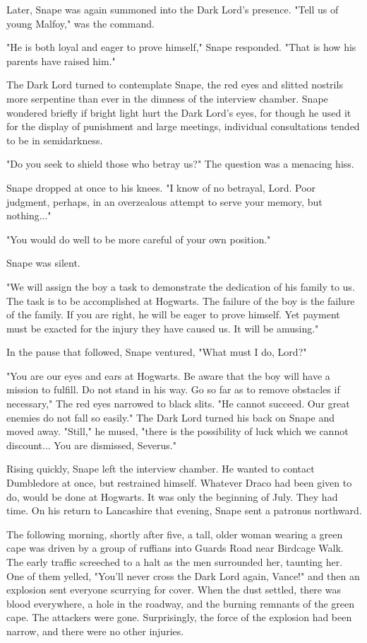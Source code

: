 \documentclass[a4paper,11pt]{article}
\begin{document}
Later, Snape was again summoned into the Dark Lord's presence. "Tell us of young Malfoy," was the command.

"He is both loyal and eager to prove himself," Snape responded. "That is how his parents have raised him."

The Dark Lord turned to contemplate Snape, the red eyes and slitted nostrils more serpentine than ever in the dimness of the interview chamber. Snape wondered briefly if bright light hurt the Dark Lord's eyes, for though he used it for the display of punishment and large meetings, individual consultations tended to be in semidarkness.

"Do you seek to shield those who betray us?" The question was a menacing hiss.

Snape dropped at once to his knees. "I know of no betrayal, Lord. Poor judgment, perhaps, in an overzealous attempt to serve your memory, but nothing..."

"You would do well to be more careful of your own position."

Snape was silent.

"We will assign the boy a task to demonstrate the dedication of his family to us. The task is to be accomplished at Hogwarts. The failure of the boy is the failure of the family. If you are right, he will be eager to prove himself. Yet payment must be exacted for the injury they have caused us. It will be amusing."

In the pause that followed, Snape ventured, "What must I do, Lord?"

"You are our eyes and ears at Hogwarts. Be aware that the boy will have a mission to fulfill. Do not stand in his way. Go so far as to remove obstacles if necessary," The red eyes narrowed to black slits. "He cannot succeed. Our great enemies do not fall so easily." The Dark Lord turned his back on Snape and moved away. "Still," he mused, "there is the possibility of luck which we cannot discount... You are dismissed, Severus."

Rising quickly, Snape left the interview chamber. He wanted to contact Dumbledore at once, but restrained himself. Whatever Draco had been given to do, would be done at Hogwarts. It was only the beginning of July. They had time. On his return to Lancashire that evening, Snape sent a patronus northward.

The following morning, shortly after five, a tall, older woman wearing a green cape was driven by a group of ruffians into Guards Road near Birdcage Walk. The early traffic screeched to a halt as the men surrounded her, taunting her. One of them yelled, "You'll never cross the Dark Lord again, Vance!" and then an explosion sent everyone scurrying for cover. When the dust settled, there was blood everywhere, a hole in the roadway, and the burning remnants of the green cape. The attackers were gone. Surprisingly, the force of the explosion had been narrow, and there were no other injuries.
\end{document}
